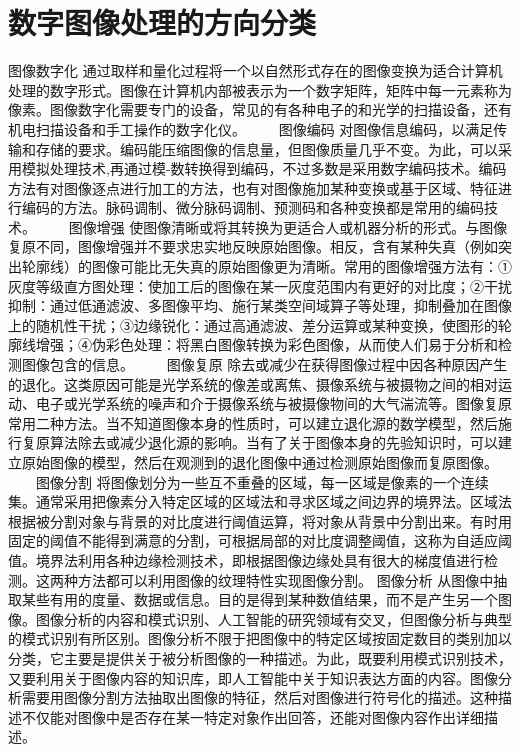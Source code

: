 \documentclass[18pt, twoside, a4paper, dvipdfm]{book}
\begin{document}
\section{数字图像处理的方向分类}

图像数字化 通过取样和量化过程将一个以自然形式存在的图像变换为适合计算机处理的数字形式。图像在计算机内部被表示为一个数字矩阵，矩阵中每一元素称为像素。图像数字化需要专门的设备，常见的有各种电子的和光学的扫描设备，还有机电扫描设备和手工操作的数字化仪。 
　　图像编码 对图像信息编码，以满足传输和存储的要求。编码能压缩图像的信息量，但图像质量几乎不变。为此，可以采用模拟处理技术,再通过模-数转换得到编码，不过多数是采用数字编码技术。编码方法有对图像逐点进行加工的方法，也有对图像施加某种变换或基于区域、特征进行编码的方法。脉码调制、微分脉码调制、预测码和各种变换都是常用的编码技术。 
　　图像增强 使图像清晰或将其转换为更适合人或机器分析的形式。与图像复原不同，图像增强并不要求忠实地反映原始图像。相反，含有某种失真（例如突出轮廓线）的图像可能比无失真的原始图像更为清晰。常用的图像增强方法有：①灰度等级直方图处理：使加工后的图像在某一灰度范围内有更好的对比度；②干扰抑制：通过低通滤波、多图像平均、施行某类空间域算子等处理，抑制叠加在图像上的随机性干扰；③边缘锐化：通过高通滤波、差分运算或某种变换，使图形的轮廓线增强；④伪彩色处理：将黑白图像转换为彩色图像，从而使人们易于分析和检测图像包含的信息。 
　　图像复原 除去或减少在获得图像过程中因各种原因产生的退化。这类原因可能是光学系统的像差或离焦、摄像系统与被摄物之间的相对运动、电子或光学系统的噪声和介于摄像系统与被摄像物间的大气湍流等。图像复原常用二种方法。当不知道图像本身的性质时，可以建立退化源的数学模型，然后施行复原算法除去或减少退化源的影响。当有了关于图像本身的先验知识时，可以建立原始图像的模型，然后在观测到的退化图像中通过检测原始图像而复原图像。 
　　图像分割 将图像划分为一些互不重叠的区域，每一区域是像素的一个连续集。通常采用把像素分入特定区域的区域法和寻求区域之间边界的境界法。区域法根据被分割对象与背景的对比度进行阈值运算，将对象从背景中分割出来。有时用固定的阈值不能得到满意的分割，可根据局部的对比度调整阈值，这称为自适应阈值。境界法利用各种边缘检测技术，即根据图像边缘处具有很大的梯度值进行检测。这两种方法都可以利用图像的纹理特性实现图像分割。 
图像分析 从图像中抽取某些有用的度量、数据或信息。目的是得到某种数值结果，而不是产生另一个图像。图像分析的内容和模式识别、人工智能的研究领域有交叉，但图像分析与典型的模式识别有所区别。图像分析不限于把图像中的特定区域按固定数目的类别加以分类，它主要是提供关于被分析图像的一种描述。为此，既要利用模式识别技术，又要利用关于图像内容的知识库，即人工智能中关于知识表达方面的内容。图像分析需要用图像分割方法抽取出图像的特征，然后对图像进行符号化的描述。这种描述不仅能对图像中是否存在某一特定对象作出回答，还能对图像内容作出详细描述。
\end{document}
